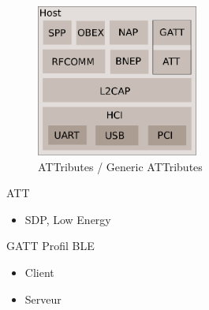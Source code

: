 \begin{frame}
\begin{minipage}[t]{0.60\linewidth}
\begin{figure}
\includegraphics[height=5cm]{arch_log_all_ble.png}
\caption{ATTributes / Generic ATTributes}
\end{figure}
\end{minipage}
\begin{minipage}[t]{0.38\linewidth}
	\begin{block}{ATT}
		\begin{itemize}
			\item SDP, Low Energy
		\end{itemize}
	\end{block}
	\begin{block}{GATT}
		Profil BLE
		\begin{itemize}
			\item Client
			\item Serveur
		\end{itemize}
	\end{block}

\end{minipage}

\end{frame}


